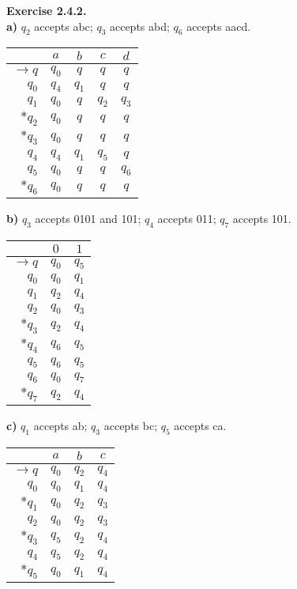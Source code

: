 \documentclass[a4paper]{article}
\newenvironment{exercise}[1]{
	\par
	\noindent\textbf{Exercise #1.}\quad
}{
	\par
	\bigskip
}
\begin{document}
\begin{exercise}{2.4.2}\hspace{0pt}\\
\textbf{a)} $q_2$ accepts abc; $q_3$ accepts abd; $q_6$ accepts aacd.
\begin{center}
\begin{tabular}{r || c | c | c | c}
& $a$ & $b$ & $c$ & $d$\\
\hline\hline
    $\rightarrow q$ & $q_0$ & $q$ & $q$ & $q$\\
    $q_0$ & $q_4$ & $q_1$ & $q$ & $q$\\
    $q_1$ & $q_0$ & $q$ & $q_2$ & $q_3$\\
    $*q_2$ & $q_0$ & $q$ & $q$ & $q$\\
    $*q_3$ & $q_0$ & $q$ & $q$ & $q$\\
    $q_4$ & $q_4$ & $q_1$ & $q_5$ & $q$\\
    $q_5$ & $q_0$ & $q$ & $q$ & $q_6$\\
    $*q_6$ & $q_0$ & $q$ & $q$ & $q$\\
\end{tabular}
\end{center}
\textbf{b)} $q_3$ accepts 0101 and 101; $q_4$ accepts 011; $q_7$ accepts 101.
\begin{center}
\begin{tabular}{r || c | c }
& $0$ & $1$\\
\hline\hline
    $\rightarrow q$ & $q_0$ & $q_5$\\
    $q_0$ & $q_0$ & $q_1$ \\
    $q_1$ & $q_2$ & $q_4$ \\
    $q_2$ & $q_0$ & $q_3$ \\
    $*q_3$ & $q_2$ & $q_4$ \\
    $*q_4$ & $q_6$ & $q_5$ \\
    $q_5$ & $q_6$ & $q_5$ \\
    $q_6$ & $q_0$ & $q_7$ \\
    $*q_7$ & $q_2$ & $q_4$ \\
\end{tabular}
\end{center}
\textbf{c)} $q_1$ accepts ab; $q_3$ accepts bc; $q_5$ accepts ca.
\begin{center}
\begin{tabular}{r || c | c | c }
& $a$ & $b$ & $c$\\
\hline\hline
    $\rightarrow q$ & $q_0$ & $q_2$ & $q_4$\\
    $q_0$ & $q_0$ & $q_1$ & $q_4$\\
    $*q_1$ & $q_0$ & $q_2$ & $q_3$ \\
    $q_2$ & $q_0$ & $q_2$ & $q_3$\\
    $*q_3$ & $q_5$ & $q_2$ & $q_4$ \\
    $q_4$ & $q_5$ & $q_2$ & $q_4$\\
    $*q_5$ & $q_0$ & $q_1$ & $q_4$ \\
\end{tabular}
\end{center}
\end{exercise}
\end{document}
